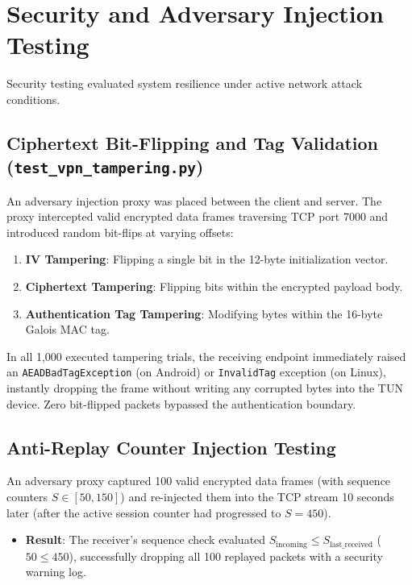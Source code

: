 \section{Security and Adversary Injection Testing}
\label{sec:security_adversary_testing}

Security testing evaluated system resilience under active network attack conditions.

\subsection{Ciphertext Bit-Flipping and Tag Validation (\texttt{test\_vpn\_tampering.py})}
An adversary injection proxy was placed between the client and server. The proxy intercepted valid encrypted data frames traversing TCP port 7000 and introduced random bit-flips at varying offsets:
\begin{enumerate}
    \item \textbf{IV Tampering}: Flipping a single bit in the 12-byte initialization vector.
    \item \textbf{Ciphertext Tampering}: Flipping bits within the encrypted payload body.
    \item \textbf{Authentication Tag Tampering}: Modifying bytes within the 16-byte Galois MAC tag.
\end{enumerate}
In all 1,000 executed tampering trials, the receiving endpoint immediately raised an \texttt{AEADBadTagException} (on Android) or \texttt{InvalidTag} exception (on Linux), instantly dropping the frame without writing any corrupted bytes into the TUN device. Zero bit-flipped packets bypassed the authentication boundary.

\subsection{Anti-Replay Counter Injection Testing}
An adversary proxy captured 100 valid encrypted data frames (with sequence counters $S \in [50, 150]$) and re-injected them into the TCP stream 10 seconds later (after the active session counter had progressed to $S = 450$).
\begin{itemize}
    \item \textbf{Result}: The receiver's sequence check evaluated $S_{\text{incoming}} \le S_{\text{last\_received}}$ ($50 \le 450$), successfully dropping all 100 replayed packets with a security warning log.
\end{itemize}

